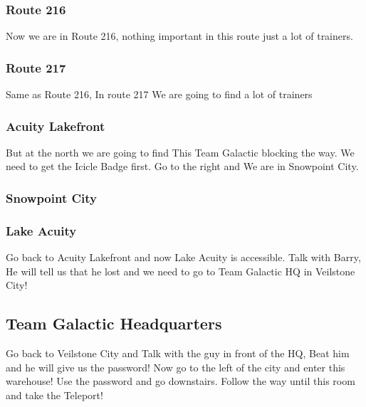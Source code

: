 \documentclass[11pt]{article}
\begin{document}



\subsubsection{Route 216}\label{subsubsec:route-2162}
Now we are in Route 216, nothing important in this route just a lot of trainers.




\subsubsection{Route 217}\label{subsubsec:route-217}
Same as Route 216, In route 217 We are going to find a lot of trainers




\subsubsection{Acuity Lakefront}\label{subsubsec:acuity-lakefront}
But at the north we are going to find This Team Galactic blocking the way.
We need to get the Icicle Badge first.
Go to the right and We are in Snowpoint City.




\subsubsection{Snowpoint City}\label{subsubsec:snowpoint-city}

\subsubsection{Lake Acuity}\label{subsubsec:lake-acuity}
Go back to Acuity Lakefront and now Lake Acuity is accessible.
Talk with Barry, He will tell us that
he lost and we need to go to Team Galactic HQ in Veilstone City!

\subsection{Team Galactic Headquarters}\label{subsec:team-galactic-headquarters}
Go back to Veilstone City and Talk with the guy in front of the HQ,
Beat him and he will give us the password!
Now go to the left of the city and enter this warehouse!
Use the password and go downstairs.
Follow the way until this room and take the Teleport!
\end{document}
